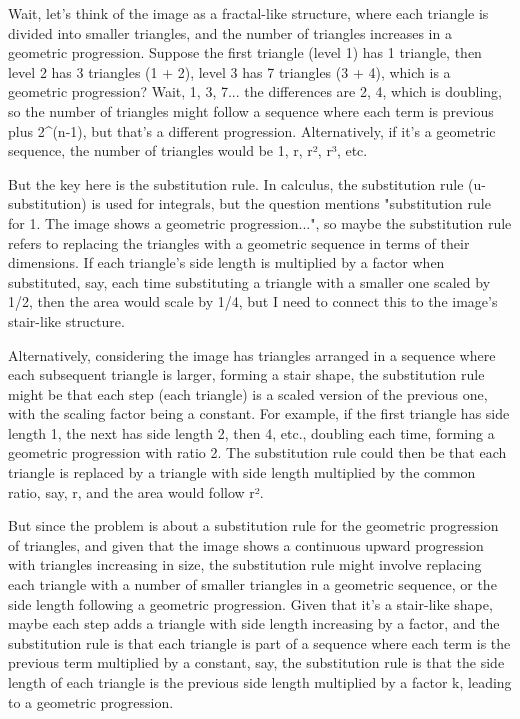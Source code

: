 Wait, let's think of the image as a fractal-like structure, where each triangle is divided into smaller triangles, and the number of triangles increases in a geometric progression. Suppose the first triangle (level 1) has 1 triangle, then level 2 has 3 triangles (1 + 2), level 3 has 7 triangles (3 + 4), which is a geometric progression? Wait, 1, 3, 7... the differences are 2, 4, which is doubling, so the number of triangles might follow a sequence where each term is previous plus 2^(n-1), but that's a different progression. Alternatively, if it's a geometric sequence, the number of triangles would be 1, r, r², r³, etc. 

But the key here is the substitution rule. In calculus, the substitution rule (u-substitution) is used for integrals, but the question mentions "substitution rule for 1. The image shows a geometric progression...", so maybe the substitution rule refers to replacing the triangles with a geometric sequence in terms of their dimensions. If each triangle's side length is multiplied by a factor when substituted, say, each time substituting a triangle with a smaller one scaled by 1/2, then the area would scale by 1/4, but I need to connect this to the image's stair-like structure. 

Alternatively, considering the image has triangles arranged in a sequence where each subsequent triangle is larger, forming a stair shape, the substitution rule might be that each step (each triangle) is a scaled version of the previous one, with the scaling factor being a constant. For example, if the first triangle has side length 1, the next has side length 2, then 4, etc., doubling each time, forming a geometric progression with ratio 2. The substitution rule could then be that each triangle is replaced by a triangle with side length multiplied by the common ratio, say, r, and the area would follow r². 

But since the problem is about a substitution rule for the geometric progression of triangles, and given that the image shows a continuous upward progression with triangles increasing in size, the substitution rule might involve replacing each triangle with a number of smaller triangles in a geometric sequence, or the side length following a geometric progression. Given that it's a stair-like shape, maybe each step adds a triangle with side length increasing by a factor, and the substitution rule is that each triangle is part of a sequence where each term is the previous term multiplied by a constant, say, the substitution rule is that the side length of each triangle is the previous side length multiplied by a factor k, leading to a geometric progression. 

